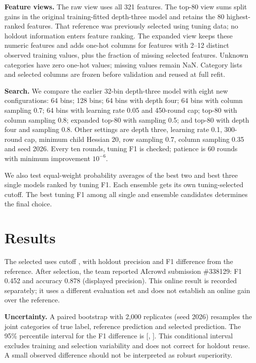\documentclass[10pt,conference,compsocconf]{IEEEtran}
\begin{document}
\textbf{Feature views.} The raw view uses all 321 features. The top-80 view sums split gains in the original training-fitted depth-three model and retains the 80 highest-ranked features. That reference was previously selected using tuning data; no holdout information enters feature ranking. The expanded view keeps these numeric features and adds one-hot columns for features with 2--12 distinct observed training values, plus the fraction of missing selected features. Unknown categories have zero one-hot values; missing values remain NaN. Category lists and selected columns are frozen before validation and reused at full refit.

\textbf{Search.} We compare the earlier 32-bin depth-three model with eight new configurations: 64 bins; 128 bins; 64 bins with depth four; 64 bins with column sampling 0.7; 64 bins with learning rate 0.05 and 450-round cap; top-80 with column sampling 0.8; expanded top-80 with sampling 0.5; and top-80 with depth four and sampling 0.8. Other settings are depth three, learning rate 0.1, 300-round cap, minimum child Hessian 20, row sampling 0.7, column sampling 0.35 and seed 2026. Every ten rounds, tuning F1 is checked; patience is 60 rounds with minimum improvement $10^{-6}$.

We also test equal-weight probability averages of the best two and best three single models ranked by tuning F1. Each ensemble gets its own tuning-selected cutoff. The best tuning F1 among all single and ensemble candidates determines the final choice.

\section{Results}

The selected \Selected{} uses cutoff \Threshold{}, with holdout precision \Precision{} and F1 difference \Difference{} from the reference. After selection, the team reported AIcrowd submission \#338129: F1 0.452 and accuracy 0.878 (displayed precision). This online result is recorded separately; it uses a different evaluation set and does not establish an online gain over the reference.

\textbf{Uncertainty.} A paired bootstrap with 2,000 replicates (seed 2026) resamples the joint categories of true label, reference prediction and selected prediction. The 95\% percentile interval for the F1 difference is [\DeltaLow{}, \DeltaHigh{}]. This conditional interval excludes training and selection variability and does not correct for holdout reuse. A small observed difference should not be interpreted as robust superiority.
\end{document}
